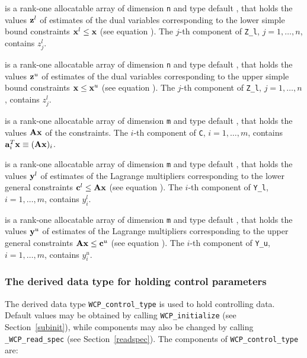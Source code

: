 \documentclass{galahad}
\newcommand{\packagename}{WCP}
\newcommand{\fullpackagename}{\libraryname\_\-\packagename}
\begin{document}
\begin{description}
 is a rank-one allocatable array of dimension {\tt n} and type default 
\realdp, that holds
the values ${\mathbf{z}}^{l}$ of estimates  of the dual variables 
corresponding to the lower simple bound constraints ${\mathbf{x}}^{l} \leq {\mathbf{x}}$
(see equation ).
The $j$-th component of {\tt Z\_l}, $j = 1,  \ldots ,  n$, 
contains $z_{j}^{l}$.  

 is a rank-one allocatable array of dimension {\tt n} and type default 
\realdp, that holds
the values ${\mathbf{z}}^{u}$ of estimates  of the dual variables 
corresponding to the upper simple bound constraints ${\mathbf{x}} \leq {\mathbf{x}}^{u}$
(see equation ).
The $j$-th component of {\tt Z\_l}, $j = 1,  \ldots ,  n$, 
contains $z_{j}^{l}$.  

 is a rank-one allocatable array of dimension {\tt m} and type default 
\realdp, that holds
the values ${\mathbf{A}} {\mathbf{x}}$ of the constraints.
The $i$-th component of {\tt C}, $i = 1,  \ldots ,  m$, contains 
${\mathbf{a}}_{i}^{T}{\mathbf{x}} \equiv ({\mathbf{A}} {\mathbf{x}})_{i}$.  

 is a rank-one allocatable array of dimension {\tt m} and type default 
\realdp, that holds
the values ${\mathbf{y}}^{l}$ of estimates  of the Lagrange multipliers
corresponding to the lower general constraints ${\mathbf{c}}^{l} \leq {\mathbf{A}} {\mathbf{x}}$
(see equation ).
The $i$-th component of {\tt Y\_l}, $i = 1,  \ldots ,  m$, 
contains $y_{i}^{l}$.  

 is a rank-one allocatable array of dimension {\tt m} and type default 
\realdp, that holds
the values ${\mathbf{y}}^{u}$ of estimates  of the Lagrange multipliers
corresponding to the upper general constraints ${\mathbf{A}} {\mathbf{x}} \leq {\mathbf{c}}^{u}$
(see equation ).
The $i$-th component of {\tt Y\_u}, $i = 1,  \ldots ,  m$, 
contains $y_{i}^{u}$.  

\end{description}


\subsubsection{The derived data type for holding control 
 parameters}\label{typecontrol}
The derived data type 
{\tt \packagename\_control\_type} 
is used to hold controlling data. Default values may be obtained by calling 
{\tt \packagename\_initialize}
(see Section~\ref{subinit}),
while components may also be changed by calling 
{\tt \fullpackagename\_read\-\_spec}
(see Section~\ref{readspec}). 
The components of 
{\tt \packagename\_control\_type} 
are:
\end{document}
